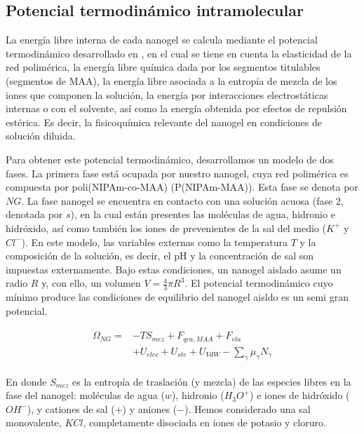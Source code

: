 	
	
	\subsection{Potencial termodin\'amico intramolecular}\label{sub:mc:omega}
	
	La energ\'ia libre interna de cada nanogel se calcula mediante el potencial termodin\'amico desarrollado en \cite{perez2021thermodynamic}, en el cual se tiene en cuenta  la elasticidad de la red polim\'erica, la energ\'ia libre qu\'imica dada por los segmentos titulables (segmentos de MAA), la energ\'ia libre asociada a la entrop\'ia de mezcla de los iones que componen la soluci\'on, la energ\'ia por interacciones electrost\'aticas internas o con el solvente, as\'i como la energ\'ia obtenida por efectos de repulsi\'on est\'erica. Es decir, la fisicoqu\'imica relevante del nanogel en condiciones de soluci\'on diluida.
	
	Para obtener este potencial termodin\'amico, desarrollamos un modelo de dos fases. La primera fase est\'a ocupada por nuestro nanogel, cuya red polim\'erica es compuesta por poli(NIPAm-co-MAA) (P(NIPAm-MAA)). Esta fase se denota por $NG$. La fase nanogel se encuentra en contacto con una soluci\'on acuosa (fase 2, denotada por $s$), en la cual est\'an presentes las mol\'eculas de agua, hidronio e hidr\'oxido, as\'i como tambi\'en los iones de prevenientes de la sal del medio ($K^+$ y $Cl^-$).
	En este modelo, las variables externas como la temperatura $T$ y la composici\'on de la soluci\'on, es decir, el pH y la concentraci\'on de sal son impuestas externamente. Bajo estas condiciones, un nanogel aislado asume un radio $R$ y, con ello, un volumen $V=\frac{4}{3}\pi R^3$.
	El potencial termodin\'amico cuyo m\'inimo produce las condiciones de equilibrio del nanogel aisldo es un semi gran potencial.
	
	
	
	\begin{align}
		\begin{aligned}
			\Omega_{NG}=& -TS_{mez} + F_{qca,MAA} +  F_{ela}\\
			& + U_{elec}+  U_{ste} + U_{VdW} -{\sum_{\gamma}
				{\mu_\gamma N_\gamma}}
		\end{aligned}
		\label{eq:mc:free-energy-implicit}
	\end{align}
	
	
	\noindent En donde $S_{mez}$ es la entrop\'ia de traslaci\'on (y mezcla) de las especies libres en la fase del nanogel: mol\'eculas de agua ($w$), hidronio ($H_3O^+$) e iones de hidr\'oxido ($OH^-$), y cationes de sal ($+$) y aniones ($-$).
	Hemos considerado una sal monovalente, $KCl$,  completamente disociada en iones de potasio y cloruro.
	
